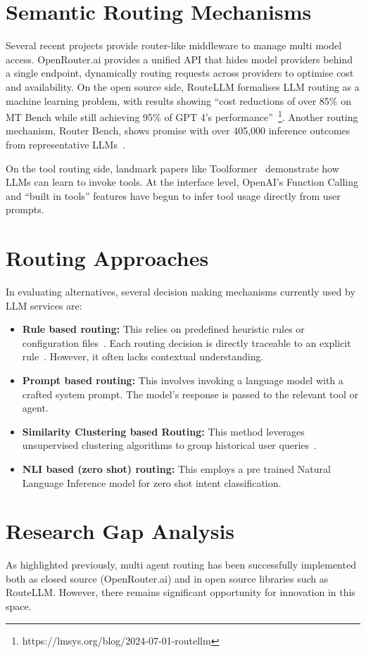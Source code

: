 \section{Semantic Routing Mechanisms}
Several recent projects provide router-like middleware to manage multi model access. OpenRouter.ai provides a unified API that hides model providers behind a single endpoint, dynamically routing requests across providers to optimise cost and availability. On the open source side, RouteLLM formalises LLM routing as a machine learning problem, with results showing ``cost reductions of over 85\% on MT Bench while still achieving 95\% of GPT 4's performance''~\footnote{https://lmsys.org/blog/2024-07-01-routellm}. Another routing mechanism, Router Bench, shows promise with over 405,000 inference outcomes from representative LLMs~\citep{hu2024routerbenchbenchmarkmultillmrouting}.

On the tool routing side, landmark papers like Toolformer~\citep{schick2023toolformerlanguagemodelsteach} demonstrate how LLMs can learn to invoke tools. At the interface level, OpenAI's Function Calling and ``built in tools'' features have begun to infer tool usage directly from user prompts.

\section{Routing Approaches}
In evaluating alternatives, several decision making mechanisms currently used by LLM services are:

\begin{itemize}
    \item \textbf{Rule based routing:} This relies on predefined heuristic rules or configuration files~\citep{liveperson2024}. Each routing decision is directly traceable to an explicit rule~\citep{aws_routing2024}. However, it often lacks contextual understanding.
    
    \item \textbf{Prompt based routing:} This involves invoking a language model with a crafted system prompt. The model's response is passed to the relevant tool or agent.
    
    \item \textbf{Similarity Clustering based Routing:} This method leverages unsupervised clustering algorithms to group historical user queries~\citep{clustering2024}.
    
    \item \textbf{NLI based (zero shot) routing:} This employs a pre trained Natural Language Inference model for zero shot intent classification.
\end{itemize}

\section{Research Gap Analysis}
As highlighted previously, multi agent routing has been successfully implemented both as closed source (OpenRouter.ai) and in open source libraries such as RouteLLM. However, there remains significant opportunity for innovation in this space.
